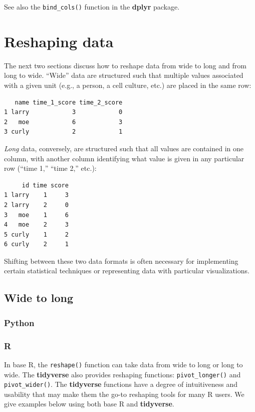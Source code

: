 \documentclass[
]{book}
\begin{document}
See also the \texttt{bind\_cols()} function in the \textbf{dplyr} package.

\hypertarget{reshaping-data}{%
\section{Reshaping data}\label{reshaping-data}}

The next two sections discuss how to reshape data from wide to long and from long to wide. ``Wide'' data are structured such that multiple values associated with a given unit (e.g., a person, a cell culture, etc.) are placed in the same row:

\begin{verbatim}
   name time_1_score time_2_score
1 larry            3            0
2   moe            6            3
3 curly            2            1
\end{verbatim}

\emph{Long} data, conversely, are structured such that all values are contained in one column, with another column identifying what value is given in any particular row (``time 1,'' ``time 2,'' etc.):

\begin{verbatim}
     id time score
1 larry    1     3
2 larry    2     0
3   moe    1     6
4   moe    2     3
5 curly    1     2
6 curly    2     1
\end{verbatim}

Shifting between these two data formats is often necessary for implementing certain statistical techniques or representing data with particular visualizations.

\hypertarget{wide-to-long}{%
\subsection{Wide to long}\label{wide-to-long}}

\hypertarget{python-32}{%
\subsubsection*{Python}\label{python-32}}

\hypertarget{r-32}{%
\subsubsection*{R}\label{r-32}}

In base R, the \texttt{reshape()} function can take data from wide to long or long to wide. The \textbf{tidyverse} also provides reshaping functions: \texttt{pivot\_longer()} and \texttt{pivot\_wider()}. The \textbf{tidyverse} functions have a degree of intuitiveness and usability that may make them the go-to reshaping tools for many R users. We give examples below using both base R and \textbf{tidyverse}.
\end{document}
